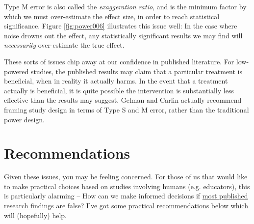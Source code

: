 \documentclass{tufte-handout}
\begin{document}
Type M error is also called the \emph{exaggeration ratio}, and is the minimum factor
by which we must over-estimate the effect size, in order to reach statistical
significance. Figure \ref{fig:power006} illustrates this issue well: In the case
where noise drowns out the effect, any statistically significant results we may
find will \emph{necessarily} over-estimate the true effect.

These sorts of issues chip away at our confidence in published literature. For
low-powered studies, the published results may claim that a particular treatment
is beneficial, when in reality it actually harms. In the event that a treatment
actually is beneficial, it is quite possible the intervention is substantially
less effective than the results may suggest. Gelman and Carlin actually
recommend framing study design in terms of Type S and M error, rather than the
traditional power design.

\section{Recommendations}
\label{sec:org3e3936e}
Given these issues, you may be feeling concerned. For those of us that would
like to make practical choices based on studies involving humans (e.g.
educators), this is particularly alarming -- How can we make informed decisions
if \href{http://journals.plos.org/plosmedicine/article?id=10.1371/journal.pmed.0020124}{most published research findings are false}?\cite{ioannidis2005most} I've got
some practical recommendations below which will (hopefully) help.
\end{document}

